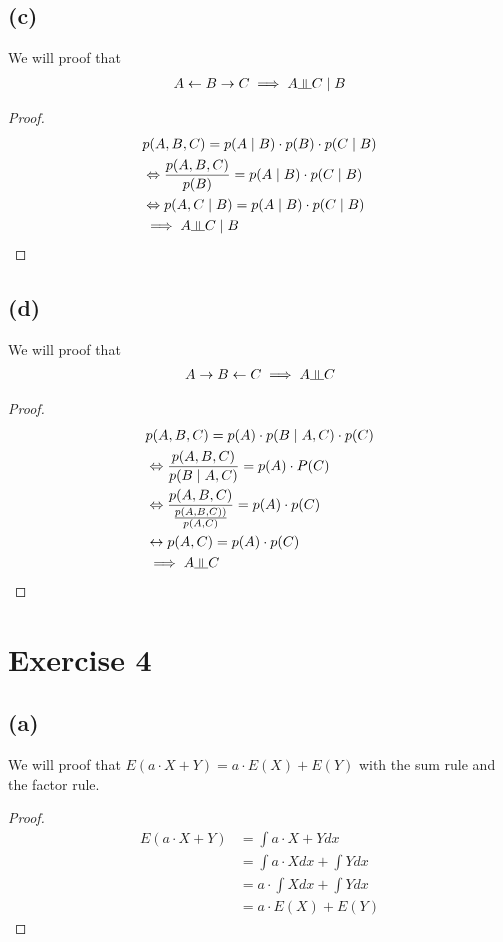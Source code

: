 \documentclass{article}
\newcommand{\dsep}{\rotatebox[origin=c]{90}{$\models$}}
\begin{document}
\subsection*{(c)}
We will proof that 
\begin{align*}
    A \leftarrow B \rightarrow C \implies A \dsep C \mid B
\end{align*}
\begin{proof}
\begin{align*}
	&p(A,B,C) = p(A \mid B) \cdot p(B) \cdot p(C \mid B)  \\
	&\Leftrightarrow \frac{p(A,B,C)}{p(B)} = p(A\mid B) \cdot p(C\mid B) \\
	&\Leftrightarrow p(A,C \mid B) = p(A\mid B) \cdot p(C\mid B) \\
    &\implies A \dsep C \mid B
\end{align*}
\end{proof}

\subsection*{(d)}
We will proof that 
\begin{align*}
    A \rightarrow B \leftarrow C \implies A \dsep C 
\end{align*}

\begin{proof}
\begin{align*}
	& p(A,B,C) = p(A) \cdot p(B \mid A,C)\cdot p(C) \\
	&\Leftrightarrow \frac{p(A,B,C)}{p(B \mid A,C)} = p(A) \cdot P(C) \\
	&\Leftrightarrow  \frac{p(A,B,C)}{\frac{p(A,B,C))}{p(A,C)}} = p(A) \cdot p(C) \\
    &\leftrightarrow p(A,C) = p(A) \cdot p(C)\\
   & \implies A \dsep C\\
\end{align*}
\end{proof}

\section*{Exercise 4}
\subsection*{(a)}
 We will proof that $E(a \cdot X + Y) = a \cdot E(X) + E(Y) $ with the sum rule and the factor rule.
\begin{proof}
	\begin{align*}
	E(a \cdot X + Y)
	& = \int a \cdot X + Y dx \\
	&= \int a \cdot X dx + \int Y dx \\
	&= a \cdot \int X dx + \int Y dx \\
	&= a \cdot E(X) + E(Y)
	\end{align*}
\end{proof}
\end{document}
